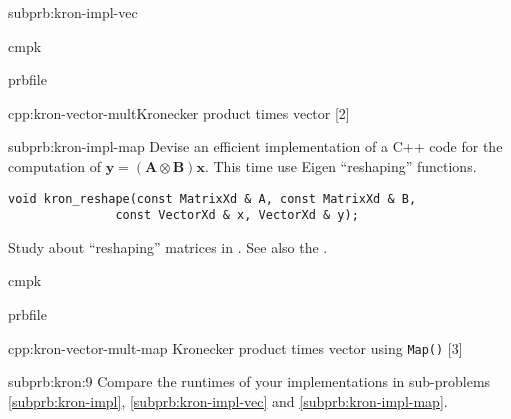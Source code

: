 \begin{samproblem}
\begin{subproblem}{subprb:kron-impl-vec}
\begin{samwriteprbpart}{cmpk}
  \begin{writeverbatim}{prbfile}
    \begin{samsolution}
      \begin{samcode}[C++11-code]{cpp:kron-vector-mult}{Kronecker product times vector}
        [2]
      \end{samcode}
    \end{samsolution}
  \end{writeverbatim}
\end{samwriteprbpart}
\end{subproblem}

\begin{subproblem}{subprb:kron-impl-map}
  Devise an efficient implementation of a C++ code for the computation of
  $\mathbf{y} = (\mathbf{A} \otimes \mathbf{B}) \mathbf{x}$. This time use
  Eigen ``reshaping'' functions.
  \begin{lstlisting}[style=cppsimple]
void kron_reshape(const MatrixXd & A, const MatrixXd & B,
               const VectorXd & x, VectorXd & y);
  \end{lstlisting}
  Study  about ``reshaping'' matrices in \eigen{}. See also the
  .

\begin{samwriteprbpart}{cmpk}
  \begin{writeverbatim}{prbfile}
    \begin{samsolution}
      \begin{samcode}[C++11-code]{cpp:kron-vector-mult-map}
        {Kronecker product times vector using \texttt{Map()}}
        [3]
      \end{samcode}
    \end{samsolution}
  \end{writeverbatim}
\end{samwriteprbpart}
\end{subproblem}

\begin{subproblem}{subprb:kron:9}
  Compare the runtimes of your implementations in sub-problems
  \ref{subprb:kron-impl}, \ref{subprb:kron-impl-vec} and \ref{subprb:kron-impl-map}.


\end{subproblem}
\end{samproblem}
